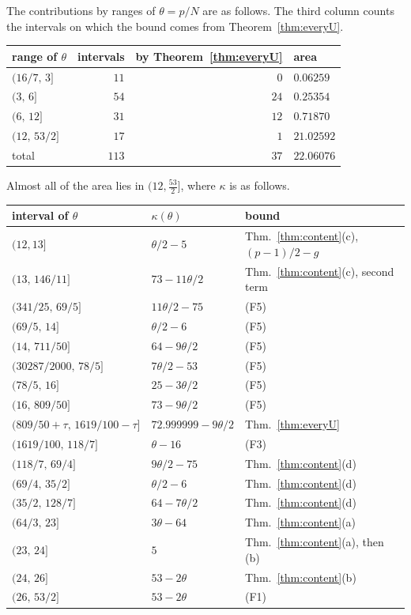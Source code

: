 \documentclass[11pt]{amsart}
\newcommand{\Chi}{22.06076}
\theoremstyle{definition}
\theoremstyle{remark}
\numberwithin{equation}{section}
\begin{document}
The contributions by ranges of $\theta=p/N$ are as follows. The third column counts the intervals on which
the bound comes from Theorem~\ref{thm:everyU}.
\begin{center}
\begin{tabular}{@{}lrrl@{}}
\toprule
range of $\theta$ & intervals & by Theorem~\ref{thm:everyU} & area \\
\midrule
$(16/7,\,3]$ & $11$ & $0$ & $0.06259$ \\
$(3,\,6]$ & $54$ & $24$ & $0.25354$ \\
$(6,\,12]$ & $31$ & $12$ & $0.71870$ \\
$(12,\,53/2]$ & $17$ & $1$ & $21.02592$ \\
\midrule
total & $113$ & $37$ & $\Chi$ \\
\bottomrule
\end{tabular}
\end{center}
Almost all of the area lies in $(12,\frac{53}2]$, where $\kappa$ is as follows.
\begin{center}
\begin{tabular}{@{}lll@{}}
\toprule
interval of $\theta$ & $\kappa(\theta)$ & bound \\
\midrule
$(12,13]$ & $\theta/2-5$ & Thm.~\ref{thm:content}(c), $(p-1)/2-g$ \\
$(13,\,146/11]$ & $73-11\theta/2$ & Thm.~\ref{thm:content}(c), second term \\
$(341/25,\,69/5]$ & $11\theta/2-75$ & (F5) \\
$(69/5,\,14]$ & $\theta/2-6$ & (F5) \\
$(14,\,711/50]$ & $64-9\theta/2$ & (F5) \\
$(30287/2000,\,78/5]$ & $7\theta/2-53$ & (F5) \\
$(78/5,\,16]$ & $25-3\theta/2$ & (F5) \\
$(16,\,809/50]$ & $73-9\theta/2$ & (F5) \\
$(809/50+\tau,\,1619/100-\tau]$ & $72.999999-9\theta/2$ & Thm.~\ref{thm:everyU} \\
$(1619/100,\,118/7]$ & $\theta-16$ & (F3) \\
$(118/7,\,69/4]$ & $9\theta/2-75$ & Thm.~\ref{thm:content}(d) \\
$(69/4,\,35/2]$ & $\theta/2-6$ & Thm.~\ref{thm:content}(d) \\
$(35/2,\,128/7]$ & $64-7\theta/2$ & Thm.~\ref{thm:content}(d) \\
$(64/3,\,23]$ & $3\theta-64$ & Thm.~\ref{thm:content}(a) \\
$(23,\,24]$ & $5$ & Thm.~\ref{thm:content}(a), then (b) \\
$(24,\,26]$ & $53-2\theta$ & Thm.~\ref{thm:content}(b) \\
$(26,\,53/2]$ & $53-2\theta$ & (F1) \\
\bottomrule
\end{tabular}
\end{center}
\end{document}
